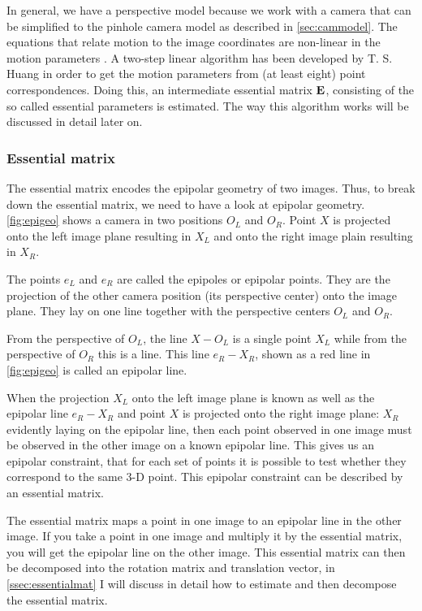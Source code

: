 In general, we have a perspective model because we work with a camera that can be simplified to the pinhole camera model as described in \autoref{sec:cammodel}. The equations that relate motion to the image coordinates are non-linear in the motion parameters \cite{tekalp}. A two-step linear algorithm has been developed by T. S. Huang \cite{improc} in order to get the motion parameters from (at least eight) point correspondences. Doing this, an intermediate essential matrix $\mathbf{E}$, consisting of the so called essential parameters is estimated. The way this algorithm works will be discussed in detail later on.

\subsubsection{Essential matrix}\label{sssec:essential_matrix}
The essential matrix encodes the epipolar geometry of two images. Thus, to break down the essential matrix, we need to have a look at epipolar geometry. \autoref{fig:epigeo} shows a camera in two positions $O_L$ and $O_R$. Point $X$ is projected onto the left image plane resulting in $X_L$ and onto the right image plain resulting in $X_R$.\bigskip

The points $e_L$ and $e_R$ are called the epipoles or epipolar points. They are the projection of the other camera position (its perspective center) onto the image plane. They lay on one line together with the perspective centers $O_L$ and $O_R$.\bigskip

From the perspective of $O_L$, the line $X-O_L$ is a single point $X_L$ while from the perspective of $O_R$ this is a line. This line $e_R-X_R$, shown as a red line in \autoref{fig:epigeo} is called an epipolar line.\bigskip

When the projection $X_L$ onto the left image plane is known as well as the epipolar line $e_R-X_R$ and point $X$ is projected onto the right image plane: $X_R$ evidently laying on the epipolar line, then each point observed in one image must be observed in the other image on a known epipolar line. This gives us an epipolar constraint, that for each set of points it is possible to test whether they correspond to the same 3-D point. This epipolar constraint can be described by an essential matrix.\bigskip

The essential matrix maps a point in one image to an epipolar line in the other image. If you take a point in one image and multiply it by the essential matrix, you will get the epipolar line on the other image. This essential matrix can then be decomposed into the rotation matrix and translation vector, in \autoref{ssec:essentialmat} I will discuss in detail how to estimate and then decompose the essential matrix.\bigskip


